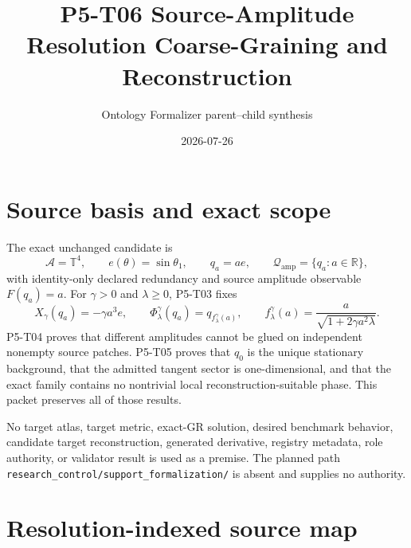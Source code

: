 \documentclass[11pt]{article}
\title{P5-T06 Source-Amplitude Resolution Coarse-Graining and Reconstruction}
\author{Ontology Formalizer parent--child synthesis}
\date{2026-07-26}
\newcommand{\Qamp}{\mathcal Q_{\mathrm{amp}}}
\begin{document}
\maketitle

\begin{center}
\end{center}

\section{Source basis and exact scope}

The exact unchanged candidate is
\[
 \mathcal A=\mathbb T^4,\qquad e(\theta)=\sin\theta_1,\qquad
 q_a=a e,\qquad \Qamp=\{q_a:a\in\mathbb R\},
\]
with identity-only declared redundancy and source amplitude observable
\(F(q_a)=a\).  For \(\gamma>0\) and \(\lambda\geq0\), P5-T03 fixes
\[
 X_\gamma(q_a)=-\gamma a^3e,\qquad
 \Phi^\gamma_\lambda(q_a)=q_{f^\gamma_\lambda(a)},\qquad
 f^\gamma_\lambda(a)=\frac{a}{\sqrt{1+2\gamma a^2\lambda}}.
 \label{eq:source-flow}
\]
P5-T04 proves that different amplitudes cannot be glued on independent
nonempty source patches.  P5-T05 proves that \(q_0\) is the unique stationary
background, that the admitted tangent sector is one-dimensional, and that
the exact family contains no nontrivial local reconstruction-suitable phase.
This packet preserves all of those results.

No target atlas, target metric, exact-GR solution, desired benchmark behavior,
candidate target reconstruction, generated derivative, registry metadata,
role authority, or validator result is used as a premise.  The planned path
\texttt{research\_control/support\_formalization/} is absent and supplies no
authority.

\section{Resolution-indexed source map}
\end{document}
